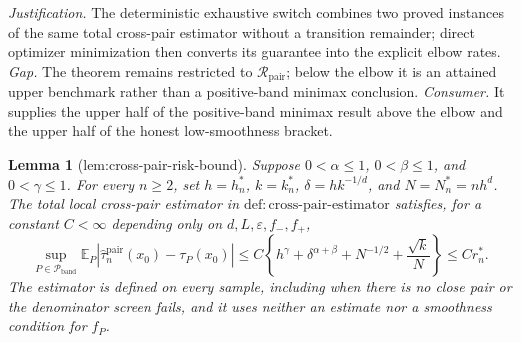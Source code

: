 \documentclass{article}
\newtheorem{lemma}{Lemma}
\begin{document}
\par\smallskip\noindent \textit{Justification.} The deterministic exhaustive switch combines two proved instances of the same total cross-pair estimator without a transition remainder; direct optimizer minimization then converts its guarantee into the explicit elbow rates. \textit{Gap.} The theorem remains restricted to \(\mathcal R_{\mathrm{pair}}\); below the elbow it is an attained upper benchmark rather than a positive-band minimax conclusion. \textit{Consumer.} It supplies the upper half of the positive-band minimax result above the elbow and the upper half of the honest low-smoothness bracket.

\begin{lemma}[lem:cross-pair-risk-bound]\label{lem:cross-pair-risk-bound}
Suppose \(0<\alpha\leq1\), \(0<\beta\leq1\), and \(0<\gamma\leq1\).  For every \(n\geq2\), set \(h=h_n^*\), \(k=k_n^*\), \(\delta=h k^{-1/d}\), and \(N=N_n^*=nh^d\).  The total local cross-pair estimator in \(\mathrm{def:cross\mbox{-}pair\mbox{-}estimator}\) satisfies, for a constant \(C<\infty\) depending only on \(d,L,\varepsilon,f_{-},f_{+}\),
\[
 \sup_{P\in\mathcal P_{\mathrm{band}}}
 \mathbb E_P\left|\widehat\tau_n^{\mathrm{pair}}(x_0)-\tau_P(x_0)\right|
 \leq C\left\{h^\gamma+\delta^{\alpha+\beta}+N^{-1/2}+\frac{\sqrt{k}}{N}\right\}
 \leq C r_n^*.
\]
The estimator is defined on every sample, including when there is no close pair or the denominator screen fails, and it uses neither an estimate nor a smoothness condition for \(f_P\).
\end{lemma}
\end{document}
